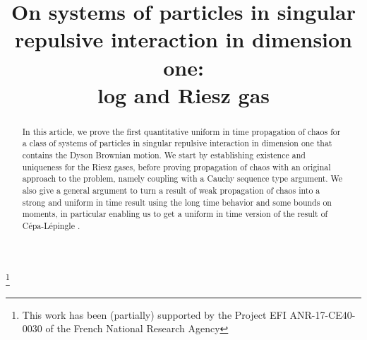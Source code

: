 \documentclass[JEP,XML,SOM,Unicode,published]{cedram}
\theoremstyle{plain}
\theoremstyle{definition}
\begin{document}
\frontmatter
\title[On systems of particles in singular repulsive interaction in dimension one: log and Riesz gas]{On systems of particles in singular repulsive interaction in dimension one:\\ log and Riesz gas}

\author[\initial{A.} \lastname{Guillin}]{ }
\address{Laboratoire de Mathématiques Blaise Pascal - Université Clermont-Auvergne\\
3 Place Vasarely,
63178 Aubière cedex, France\\
\& Institut Universitaire de France}

\author[\initial{P.} \lastname{Le Bris}]{ }
\address{Laboratoire Jacques-Louis Lions - Sorbonne Université\\
75252 Paris cedex 05, France}

\author[\initial{P.} \lastname{Monmarché}]{ }
\address{Laboratoire Jacques-Louis Lions - Sorbonne Université\\
75252 Paris cedex 05, France}

\thanks{This work has been (partially) supported by the Project EFI ANR-17-CE40-0030 of the French National Research Agency}

\begin{abstract}
In this article, we prove the first quantitative uniform in time propagation of chaos for a class of systems of particles in singular repulsive interaction in dimension one that contains the Dyson Brownian motion. We start by establishing existence and uniqueness for the Riesz gases, before proving propagation of chaos with an original approach to the problem, namely coupling with a Cauchy sequence type argument. We also give a general argument to turn a result of weak propagation of chaos into a strong and uniform in time result using the long time behavior and some bounds on moments, in particular enabling us to get a uniform in time version of the result of Cépa-Lépingle \cite{cepa_lepingle}.
\end{abstract}


\end{document}
